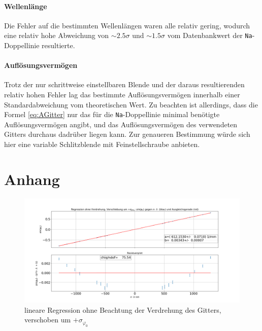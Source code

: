 \documentclass[a4paper, 11pt]{article}
\begin{document}
\paragraph{Wellenlänge}
Die Fehler auf die bestimmten Wellenlängen waren alle relativ gering, wodurch eine relativ hohe Abweichung von $\sim2.5\sigma$ und $\sim 1.5\sigma$ vom Datenbankwert der \texttt{Na}-Doppellinie resultierte.

\paragraph{Auflösungsvermögen}
Trotz der nur schrittweise einstellbaren Blende und der daraus resultierenden relativ hohen Fehler lag das bestimmte Auflösungsvermögen innerhalb einer Standardabweichung vom theoretischen Wert. Zu beachten ist allerdings, dass die Formel \ref{eq:AGitter} nur das für die \texttt{Na}-Doppellinie minimal benötigte Auflösungsvermögen angibt, und das Auflösungsvermögen des verwendeten Gitters durchaus dadrüber liegen kann.
Zur genaueren Bestimmung würde sich hier eine variable Schlitzblende mit Feinstellschraube anbieten.


\clearpage
\section{Anhang}
\textwidth
\begin{figure}[H]
	\hskip-2.5cm
	\includegraphics[scale=0.45]{./Bilder/Gitter_Regression_ohne_Verdrehung_+.png}
	\caption{lineare Regression ohne Beachtung der Verdrehung des Gitters, verschoben um $+ \sigma_{\varphi_0}$}
	\label{pic:linReg_1_+}	
\end{figure}
\end{document}
